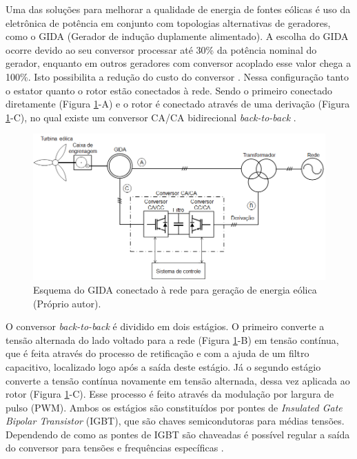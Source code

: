 	Uma das soluções para melhorar a qualidade de energia de fontes eólicas é uso da eletrônica de potência em conjunto com topologias alternativas de geradores, como o GIDA (Gerador de indução duplamente alimentado).  A escolha do GIDA ocorre devido ao seu conversor processar até 30\% da potência nominal do gerador, enquanto em outros geradores com conversor acoplado esse valor chega a 100\%. Isto possibilita a redução do custo do conversor \cite{dattacomparacao,simoesrenewableinduction}. Nessa configuração tanto o estator quanto o rotor estão conectados à rede. Sendo o primeiro conectado diretamente (Figura \ref{figura:gida_esquematico}-A) e o rotor  é conectado através de uma derivação (Figura \ref{figura:gida_esquematico}-C), no qual existe um conversor CA/CA bidirecional \emph{back-to-back} \cite{heliodfig}.
	\begin{figure}[h]
		\centering
		\includegraphics[width=1\textwidth]{Figuras/gida_esquematico.png}
		\caption{Esquema do GIDA conectado à rede para geração de energia eólica (Próprio autor).}
		\label{figura:gida_esquematico}
	\end{figure}

	O conversor \emph{back-to-back} é dividido em dois estágios. O primeiro converte a tensão alternada do lado voltado para a rede (Figura \ref{figura:gida_esquematico}-B) em tensão contínua, que é feita através do processo de retificação e com a ajuda de um filtro capacitivo, localizado logo após a saída deste estágio. Já o segundo estágio converte a tensão contínua novamente em tensão alternada, dessa vez aplicada ao rotor (Figura \ref{figura:gida_esquematico}-C). Esse processo é feito através da modulação por largura de pulso (PWM). Ambos os estágios são constituídos por pontes de \emph{Insulated Gate Bipolar Transistor} (IGBT), que são chaves semicondutoras para médias tensões. Dependendo de como as pontes de IGBT são chaveadas é possível regular a saída do conversor para tensões e frequências específicas \cite{alfeu}. 
	
